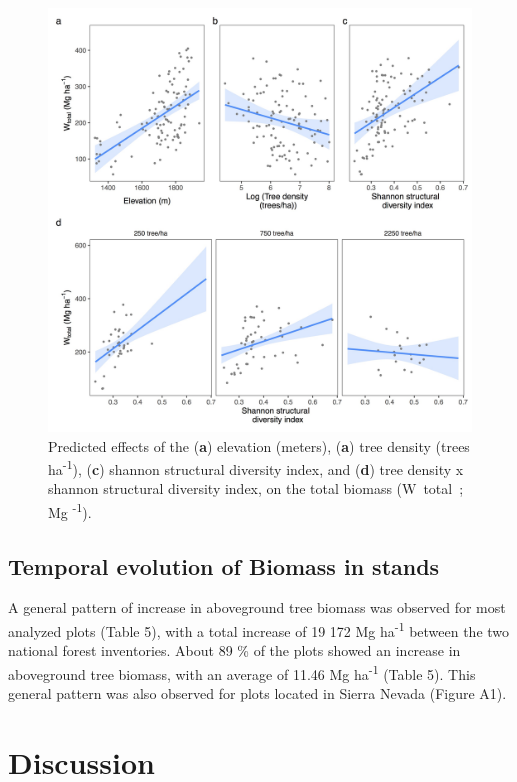 \begin{figure}
    \centering
    \includegraphics[width=\textwidth]{img/carbon/carbon-glm-effects.jpg}
    \caption{Predicted effects of the (\textbf{a}) elevation (meters), (\textbf{a}) tree density (trees ha\textsuperscript{-1}), (\textbf{c}) shannon structural diversity index, and (\textbf{d}) tree density x shannon structural diversity index, on the total biomass (W~total~; Mg \textsuperscript{-1}).}
    \label{fig:carbon:glm}
\end{figure}


\subsection{Temporal evolution of Biomass in \Qp stands}\label{sec:carbon:results-temporal}
A general pattern of increase in aboveground tree biomass was observed for most analyzed plots (Table 5), with a total increase of 19 172 Mg ha\textsuperscript{-1} between the two national forest inventories. About 89 \% of the plots showed an increase in aboveground tree biomass, with an average of 11.46 Mg ha\textsuperscript{-1} (Table 5). This general pattern was also observed for plots located in Sierra Nevada (Figure A1).

\section{Discussion}\label{sec:carbon:discussion}
